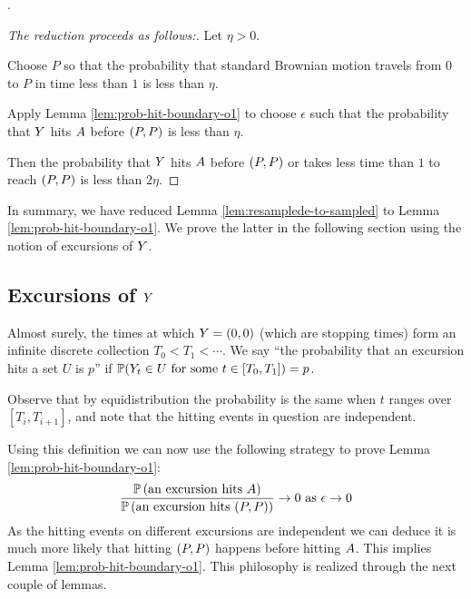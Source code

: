 {\begin{lemma}\label{lem:prob-hit-boundary-o1}
  .
\end{lemma}

\newcommand{\origin}{(0,0)}

\begin{proof}[The reduction proceeds as follows:]
  Let $\eta > 0$.

  Choose $P$ so that the probability that standard Brownian motion
  travels from $0$ to $P$ in time less than $1$ is less than
  $\eta$.

  Apply Lemma \ref{lem:prob-hit-boundary-o1} to
  choose $\epsilon$ such that the probability that $Y$ hits
  $A$ before $(P,P)$ is less than $\eta$.

  Then the probability that $Y$ hits $A$ before $(P,P)$
  or takes less time than $1$ to reach $(P,P)$ is
  less than $2\eta$.
\end{proof}

In summary, we have reduced Lemma \ref{lem:resamplede-to-sampled} to
Lemma \ref{lem:prob-hit-boundary-o1}. We prove the latter in the
following section using the notion of excursions of $Y$.

\subsection{Excursions of $Y$}

\newcommand{\excursionstart}{T}
{
  Almost surely, the times at which $\twodim = \origin$ (which are stopping
  times) form an infinite discrete collection $\excursionstart_0 <
  \excursionstart_1 < \cdots$. We say ``the probability that an excursion
  hits a set $U$ is $p$'' if $\P(\twodim_t\in U \text{
  for some } t\in [\excursionstart_0, \excursionstart_{1}]) = p$.

  Observe that by equidistribution the probability is the same when
  $t$ ranges over $[\excursionstart_i, \excursionstart_{i+1}]$, and
  note that the hitting events in question are independent.
}

\newcommand{\probexcursionhits}[1]{\P\left(\text{an excursion hits } #1\right)}

Using this definition we can now use the following strategy to
prove Lemma \ref{lem:prob-hit-boundary-o1}:
\[
\frac{\probexcursionhits{\boundarylines}}
     {\probexcursionhits{\farpoint}}
        \to 0 \text{ as } \epsilon\to0
\]
As the hitting events on different excursions are independent we
can deduce it is much more likely that hitting $(P,P)$ happens
before hitting $A$. This implies Lemma
\ref{lem:prob-hit-boundary-o1}. This philosophy is
realized through the next couple of lemmas.

}
